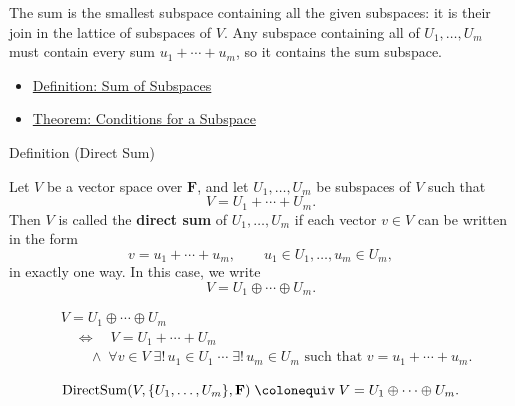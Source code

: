 \begin{remark*}[Interpretation]
The sum is the smallest subspace containing all the given subspaces: it is
their join in the lattice of subspaces of $V$. Any subspace containing all
of $U_1,\ldots,U_m$ must contain every sum $u_1+\cdots+u_m$, so it
contains the sum subspace.
\end{remark*}

\begin{remark*}[Dependencies]
\begin{itemize}
  \item \hyperref[def:sum-of-subspaces]{Definition: Sum of Subspaces}
  \item \hyperref[thm:conditions-for-a-subspace]{Theorem: Conditions for a Subspace}
\end{itemize}
\end{remark*}


\begin{definitionbox}{Definition (Direct Sum)}
\begin{definition}
\label{def:direct-sum}
Let $V$ be a vector space over $\mathbf{F}$, and let
$U_1,\dots,U_m$ be subspaces of $V$ such that
\[
V=U_1+\cdots+U_m.
\]
Then $V$ is called the \textbf{direct sum} of $U_1,\dots,U_m$ if each
vector $v \in V$ can be written in the form
\[
v=u_1+\cdots+u_m,
\qquad
u_1 \in U_1,\dots,u_m \in U_m,
\]
in exactly one way.
In this case, we write
\[
V=U_1\oplus\cdots\oplus U_m.
\]
\end{definition}
\end{definitionbox}

\begin{remark*}
\[
\begin{aligned}
&V=U_1\oplus\cdots\oplus U_m \\
&\quad\Longleftrightarrow\quad
V=U_1+\cdots+U_m \\
&\qquad\land\;
\forall v \in V\;
\exists!\, u_1 \in U_1 \;\cdots\; \exists!\, u_m \in U_m
\text{ such that } v=u_1+\cdots+u_m.
\end{aligned}
\]
\end{remark*}

\begin{remark*}
\[
\operatorname{DirectSum}(V,\{U_1,\dots,U_m\},\mathbf{F})
\;\colonequiv\;
V=U_1\oplus\cdots\oplus U_m.
\]
\end{remark*}

